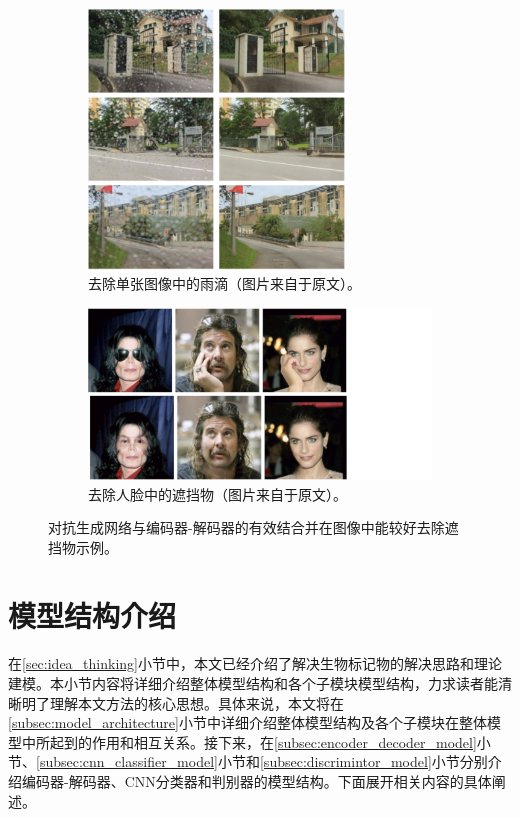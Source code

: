 \begin{figure}[h!]
	\begin{subfigure}{0.45\textwidth}
		\centering
		\includegraphics[width=0.75\textwidth]{figure/attention_gan_example.png}
		\caption{去除单张图像中的雨滴（图片来自于原文）。}
		\label{subfig:attention_gan}
	\end{subfigure}
	\begin{subfigure}{0.45\textwidth}
		\centering
		\includegraphics[width=1.5\textwidth]{figure/face_de_occulusion.png}
		\caption{去除人脸中的遮挡物（图片来自于原文）。}
		\label{subfig:face_de_occulusion}
	\end{subfigure}
	\caption{对抗生成网络与编码器-解码器的有效结合并在图像中能较好去除遮挡物示例。}
	\label{mul_fig:gan_auto_encoder_example}
\end{figure}

\section{模型结构介绍}\label{sec:model_architecture_intro}
在\ref{sec:idea_thinking}小节中，本文已经介绍了解决生物标记物的解决思路和理论建模。本小节内容将详细介绍整体模型结构和各个子模块模型结构，力求读者能清晰明了理解本文方法的核心思想。具体来说，本文将在\ref{subsec:model_architecture}小节中详细介绍整体模型结构及各个子模块在整体模型中所起到的作用和相互关系。接下来，在\ref{subsec:encoder_decoder_model}小节、\ref{subsec:cnn_classifier_model}小节和\ref{subsec:discrimintor_model}小节分别介绍编码器-解码器、CNN分类器和判别器的模型结构。下面展开相关内容的具体阐述。

